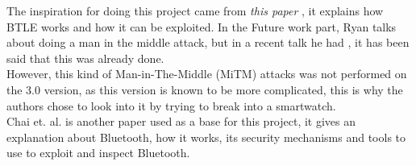 The inspiration for doing this project came from \textit{this paper} \cite{mryan2014ble}, it explains how BTLE works and how it can be exploited. In the Future work part, Ryan talks about doing a man in the middle attack, but in a recent talk he had \cite{hitbox_mike_ryan}, it has been said that this was already done. \\
However, this kind of Man-in-The-Middle (MiTM) attacks was not performed on the 3.0 version, as this version is known to be more complicated, this is why the authors chose to look into it by trying to break into a smartwatch.\\
Chai et. al. \cite{chai20126} is another paper used as a base for this project, it gives an explanation about Bluetooth, how it works, its security mechanisms and tools to use to exploit and inspect Bluetooth. 